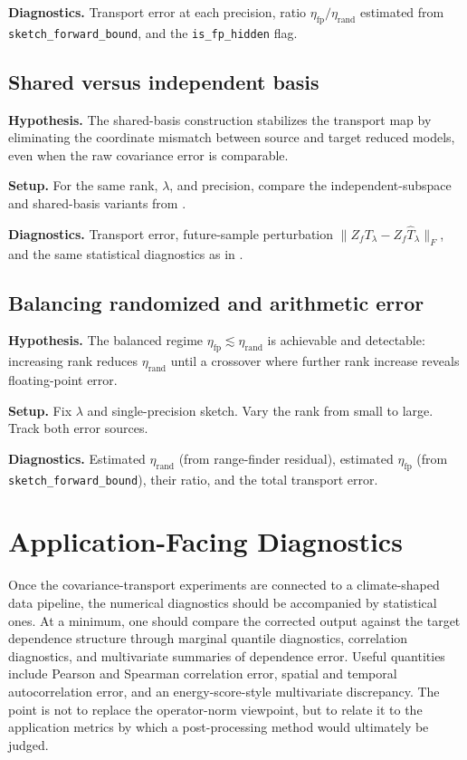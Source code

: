 \textbf{Diagnostics.}  Transport error at each precision, ratio
\(\eta_{\mathrm{fp}} / \eta_{\mathrm{rand}}\) estimated from
\texttt{sketch\_forward\_bound}, and the \texttt{is\_fp\_hidden} flag.

\subsection{Shared versus independent basis}

\textbf{Hypothesis.}  The shared-basis construction stabilizes the transport
map by eliminating the coordinate mismatch between source and target reduced
models, even when the raw covariance error is comparable.

\textbf{Setup.}  For the same rank, \(\lambda\), and precision, compare the
independent-subspace and shared-basis variants from
.

\textbf{Diagnostics.}  Transport error, future-sample perturbation
\(\|Z_f T_\lambda - Z_f \widehat T_\lambda\|_F\), and the same statistical
diagnostics as in .

\subsection{Balancing randomized and arithmetic error}

\textbf{Hypothesis.}  The balanced regime \(\eta_{\mathrm{fp}} \lesssim
\eta_{\mathrm{rand}}\) is achievable and detectable: increasing rank reduces
\(\eta_{\mathrm{rand}}\) until a crossover where further rank increase reveals
floating-point error.

\textbf{Setup.}  Fix \(\lambda\) and single-precision sketch.  Vary the rank
from small to large.  Track both error sources.

\textbf{Diagnostics.}  Estimated \(\eta_{\mathrm{rand}}\) (from range-finder
residual), estimated \(\eta_{\mathrm{fp}}\) (from
\texttt{sketch\_forward\_bound}), their ratio, and the total transport error.

\section{Application-Facing Diagnostics}
\label{sec:application_diagnostics}

Once the covariance-transport experiments are connected to a climate-shaped data
pipeline, the numerical diagnostics should be accompanied by statistical ones. At a
minimum, one should compare the corrected output against the target dependence
structure through marginal quantile diagnostics, correlation diagnostics, and
multivariate summaries of dependence error. Useful quantities include Pearson and
Spearman correlation error, spatial and temporal autocorrelation error, and an
energy-score-style multivariate discrepancy. The point is not to replace the
operator-norm viewpoint, but to relate it to the application metrics by which a
post-processing method would ultimately be judged.

